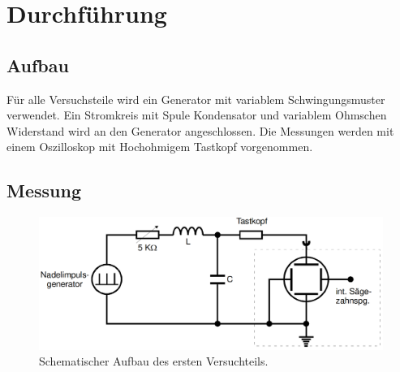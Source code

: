 \section{Durchführung}
\label{sec:Durchführung}


\subsection{Aufbau}

Für alle Versuchsteile wird ein Generator mit variablem Schwingungsmuster verwendet.
Ein Stromkreis mit Spule Kondensator und variablem Ohmschen Widerstand wird an den Generator angeschlossen.
Die Messungen werden mit einem Oszilloskop mit Hochohmigem Tastkopf vorgenommen. 
\subsection{Messung}

\begin{figure}[h!]
    \centering
    \includegraphics[width=\linewidth]{img/Kreis1.png}
    \caption{Schematischer Aufbau des ersten Versuchteils.\cite{V354}}
    \label{fig:Aufbau1}
\end{figure}

